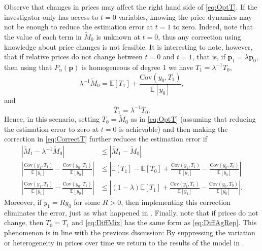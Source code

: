 \documentclass[english, a4paper, 12pt]{article}
\begin{document}
Observe that changes in prices may affect the right hand side of \eqref{eq:OptT}. If the investigator only has access to $t =0$ variables, knowing the price dynamics may not be enough to reduce the estimation error at $t =1$ to zero. Indeed, note that the value of each term in $\tilde{M}_{0}$ is unknown at $t=0$, thus any correction using knowledge about price changes is not feasible. It is interesting to note, however, that if relative prices do not change between $t=0$ and $t=1$, that is, if $\mathbf{p}_{1} = \lambda \mathbf{p}_{0}$, then using that $P_{\alpha}(\mathbf{p})$ is homogeneous of degree 1 we have $T_{1} = \lambda^{-1}T_{0}$,
	$$\lambda^{-1}\tilde{M}_{0} = \mathbb{E}[T_{1}] + \frac{\mathrm{Cov}\left(y_{0}, T_{1} \right)}{\mathbb{E}[y_{0}]},$$
and
	\begin{equation} \label{eq:CorrectT}
		\overline{T}_{1} = \lambda^{-1}\overline{T}_{0}.
	\end{equation}
Hence, in this scenario, setting $\overline{T}_{0} = \tilde{M}_{0}$ as in \eqref{eq:OptT} (assuming that reducing the estimation error to zero at $t=0$ is achievable) and then making the correction in \eqref{eq:CorrectT} further reduces the estimation error if
	\begin{align*}
		\left|\tilde{M}_{1} - \lambda^{-1}\tilde{M}_{0} \right|
			&\leq \left|\tilde{M}_{1} - \tilde{M}_{0} \right|	\\
		\left| \frac{\mathrm{Cov}\left(y_{1}, T_{1} \right)}{\mathbb{E}[y_{1}]} - \frac{\mathrm{Cov}\left(y_{0}, T_{1} \right)}{\mathbb{E}[y_{0}]} \right|
			&\leq \left| \mathbb{E}\left[T_{1} \right] - \mathbb{E}\left[T_{0} \right] + \frac{\mathrm{Cov}\left(y_{1}, T_{1} \right)}{\mathbb{E}[y_{1}]} - \frac{\mathrm{Cov}\left(y_{0}, T_{0} \right)}{\mathbb{E}[y_{0}]} \right|	\\
		\left| \frac{\mathrm{Cov}\left(y_{1}, T_{1} \right)}{\mathbb{E}[y_{1}]} - \frac{\mathrm{Cov}\left(y_{0}, T_{1} \right)}{\mathbb{E}[y_{0}]} \right|
			&\leq \left| (1-\lambda)\mathbb{E}\left[T_{1} \right] + \frac{\mathrm{Cov}\left(y_{1}, T_{1} \right)}{\mathbb{E}[y_{1}]} - \frac{\mathrm{Cov}\left(y_{0}, T_{0} \right)}{\mathbb{E}[y_{0}]} \right|.
	\end{align*}
\newpage \noindent
Moreover, if $y_{1} = Ry_{0}$ for some $R>0$, then implementing this correction eliminates the error, just as what happened in . Finally, note that if prices do not change, then $T_{0} = T_{1}$ and \eqref{eq:DiffMix} has the same form as \eqref{eq:DiffAgRep}. This phenomenon is in line with the previous discussion: By suppressing the variation or heterogeneity in prices over time we return to the results of the model in .
\end{document}
